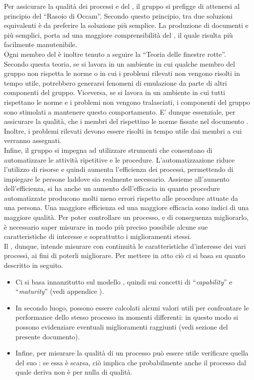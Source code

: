 
	Per assicurare la qualità dei processi e del , il gruppo \groupname{} si prefigge di attenersi al principio del “Rasoio di Occam”. Secondo questo principio, tra due soluzioni equivalenti è da preferire la soluzione più semplice. La produzione di documenti e  più semplici, porta ad una maggiore comprensibilità del , il quale risulta più facilmente manutenibile.\\
Ogni membro del  è inoltre tenuto a seguire la “Teoria delle finestre rotte”. Secondo questa teoria, se si lavora in un ambiente in cui qualche membro del gruppo non rispetta le norme o in cui i problemi rilevati non vengono risolti in tempo utile, potrebbero generarsi fenomeni di emulazione da parte di altri componenti del gruppo. Viceversa, se si lavora in un ambiente in cui tutti rispettano le norme e i problemi non vengono tralasciati, i componenti del gruppo sono stimolati a mantenere questo comportamento. E' dunque essenziale, per assicurare la qualità, che i membri del  rispettino le norme fissate nel documento . Inoltre, i problemi rilevati devono essere risolti in tempo utile dai membri a cui verranno assegnati.\\
Infine, il gruppo si impegna ad utilizzare strumenti che consentano di automatizzare le attività ripetitive e le procedure. L'automatizzazione riduce l'utilizzo di risorse e quindi aumenta l'efficienza dei processi, permettendo di impiegare le persone laddove sia realmente necessario. Assieme all'aumento dell'efficienza, si ha anche un aumento dell'efficacia in quanto procedure automatizzate producono molti meno errori rispetto alle procedure attuate da una persona. Una maggiore efficienza ed una maggiore efficacia sono indici di una maggiore qualità.
		Per poter controllare un processo, e di conseguenza migliorarlo, è necessario saper misurare in modo più preciso possibile alcune sue 
		caratteristiche di interesse e soprattutto i miglioramenti stessi.\\
		Il , dunque, intende misurare con continuità le caratteristiche d'interesse dei vari processi, ai fini di poterli migliorare. Per mettere in atto ciò ci si basa su quanto descritto in seguito.
		\begin{itemize}
			\item Ci si basa innanzitutto sul modello , quindi sui concetti di “\textit{capability}” e “\textit{maturity}” (vedi appendice ).
			\item In secondo luogo, possono essere calcolati alcuni valori utili per confrontare le performance dello stesso processo in momenti differenti: in questo modo si possono evidenziare eventuali miglioramenti raggiunti (vedi sezione  del presente documento).
			\item Infine, per misurare la qualità di un processo può essere utile verificare quella del suo : se essa è scarsa, ciò implica che probabilmente anche il processo dal quale deriva non è per nulla di qualità.
		\end{itemize}
